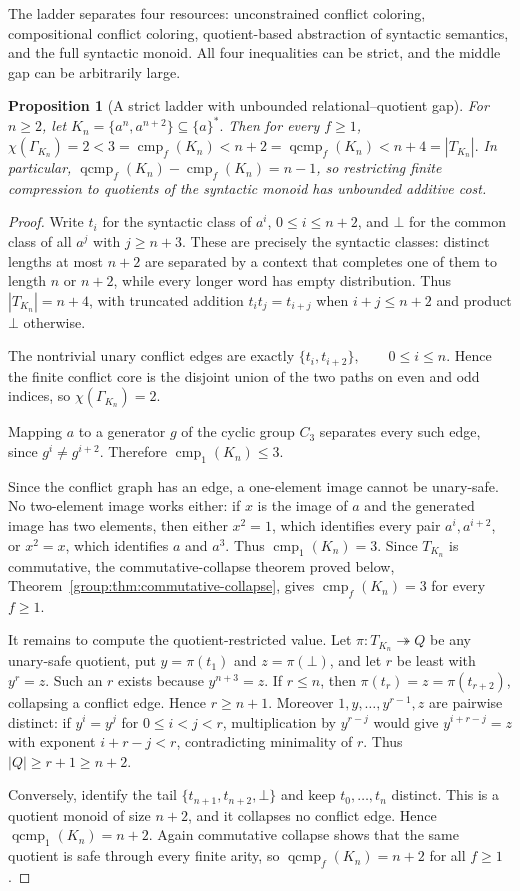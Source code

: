 \documentclass[10pt,a4paper]{article}
\newtheorem{proposition}[theorem]{Proposition}
\theoremstyle{definition}
\theoremstyle{remark}
\newcommand{\cmp}{\operatorname{cmp}}
\newcommand{\qcmp}{\operatorname{qcmp}}
\begin{document}
The ladder separates four resources: unconstrained conflict coloring,
compositional conflict coloring, quotient-based abstraction of syntactic
semantics, and the full syntactic monoid.  All four inequalities can be strict,
and the middle gap can be arbitrarily large.

\begin{proposition}[A strict ladder with unbounded relational--quotient gap]
\label{conf:prop:strict-ladder-family}
For $n\ge2$, let
\(K_n=\{a^n,a^{n+2}\}\subseteq\{a\}^*.\)
Then for every $f\ge1$,
\(\chi(\Gamma_{K_n})=2 <3=\cmp_f(K_n) <n+2=\qcmp_f(K_n) <n+4=|T_{K_n}|.\)
In particular, $\qcmp_f(K_n)-\cmp_f(K_n)=n-1$, so restricting finite
compression to quotients of the syntactic monoid has unbounded additive cost.
\end{proposition}

\begin{proof}
Write $t_i$ for the syntactic class of $a^i$, $0\le i\le n+2$, and $\bot$
for the common class of all $a^j$ with $j\ge n+3$.  These are precisely the
syntactic classes: distinct lengths at most $n+2$ are separated by a context
that completes one of them to length $n$ or $n+2$, while every longer word has
empty distribution.  Thus $|T_{K_n}|=n+4$, with truncated addition
$t_it_j=t_{i+j}$ when $i+j\le n+2$ and product $\bot$ otherwise.

The nontrivial unary conflict edges are exactly
\(\{t_i,t_{i+2}\},\qquad 0\le i\le n.\)
Hence the finite conflict core is the disjoint union of the two paths on even
and odd indices, so $\chi(\Gamma_{K_n})=2$.

Mapping $a$ to a generator $g$ of the cyclic group $C_3$ separates every such
edge, since $g^i\ne g^{i+2}$.  Therefore $\cmp_1(K_n)\le3$.

Since the conflict graph has an edge, a one-element image cannot be
unary-safe.  No two-element image works either: if $x$ is the image of $a$
and the generated image has two elements, then either $x^2=1$, which
identifies every pair $a^i,a^{i+2}$, or $x^2=x$, which identifies
$a$ and $a^3$.  Thus $\cmp_1(K_n)=3$.  Since
$T_{K_n}$ is commutative, the commutative-collapse theorem proved below,
Theorem~\ref{group:thm:commutative-collapse}, gives
$\cmp_f(K_n)=3$ for every $f\ge1$.

It remains to compute the quotient-restricted value.  Let
$\pi:T_{K_n}\twoheadrightarrow Q$ be any unary-safe quotient, put
$y=\pi(t_1)$ and $z=\pi(\bot)$, and let $r$ be least with $y^r=z$.  Such an
$r$ exists because $y^{n+3}=z$.  If $r\le n$, then
$\pi(t_r)=z=\pi(t_{r+2})$, collapsing a conflict edge.  Hence $r\ge n+1$.
Moreover $1,y,\ldots,y^{r-1},z$ are pairwise distinct: if
$y^i=y^j$ for $0\le i<j<r$, multiplication by $y^{r-j}$ would give
$y^{i+r-j}=z$ with exponent $i+r-j<r$, contradicting minimality of $r$.
Thus $|Q|\ge r+1\ge n+2$.

Conversely, identify the tail
$\{t_{n+1},t_{n+2},\bot\}$ and keep
$t_0,\ldots,t_n$ distinct.  This is a quotient monoid of size $n+2$, and it
collapses no conflict edge.  Hence $\qcmp_1(K_n)=n+2$.  Again commutative
collapse shows that the same quotient is safe through every finite arity, so
$\qcmp_f(K_n)=n+2$ for all $f\ge1$.
\end{proof}
\end{document}
